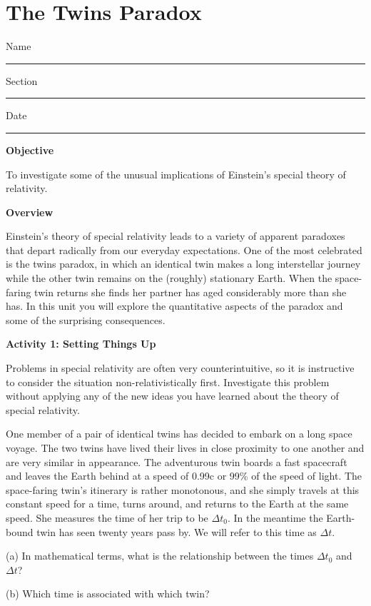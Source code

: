 
\section{The Twins Paradox}

Name \rule{2.0in}{0.1pt}\hfill{}Section \rule{1.0in}{0.1pt}\hfill{}Date
\rule{1.0in}{0.1pt}

\textbf{Objective}

To investigate some of the unusual implications of Einstein's special
theory of relativity.

\textbf{Overview}

Einstein's theory of special relativity leads to a variety of apparent
paradoxes that depart radically from our everyday expectations. One
of the most celebrated is the twins paradox, in which an identical
twin makes a long interstellar journey while the other twin remains
on the (roughly) stationary Earth. When the space-faring twin returns
she finds her partner has aged considerably more than she has. In
this unit you will explore the quantitative aspects of the paradox
and some of the surprising consequences.

\textbf{Activity 1: Setting Things Up}

Problems in special relativity are often very counterintuitive, so
it is instructive to consider the situation non-relativistically first.
Investigate this problem without applying any of the new ideas you
have learned about the theory of special relativity.

One member of a pair of identical twins has decided to embark on a
long space voyage. The two twins have lived their lives in close proximity
to one another and are very similar in appearance. The adventurous
twin boards a fast spacecraft and leaves the Earth behind at a speed
of 0.99c or 99\% of the speed of light. The space-faring twin's itinerary
is rather monotonous, and she simply travels at this constant speed
for a time, turns around, and returns to the Earth at the same speed.
She measures the time of her trip to be \( \Delta  t_{0} \).
In the meantime the Earth-bound twin has seen twenty years pass by.
We will refer to this time as \( \Delta  t\).

(a) In mathematical terms, what is the relationship between the times
\( \Delta  t_{0} \) and \( \Delta t \)?
\vspace{15mm}

(b) Which time is associated with which twin?
\vspace{15mm}

